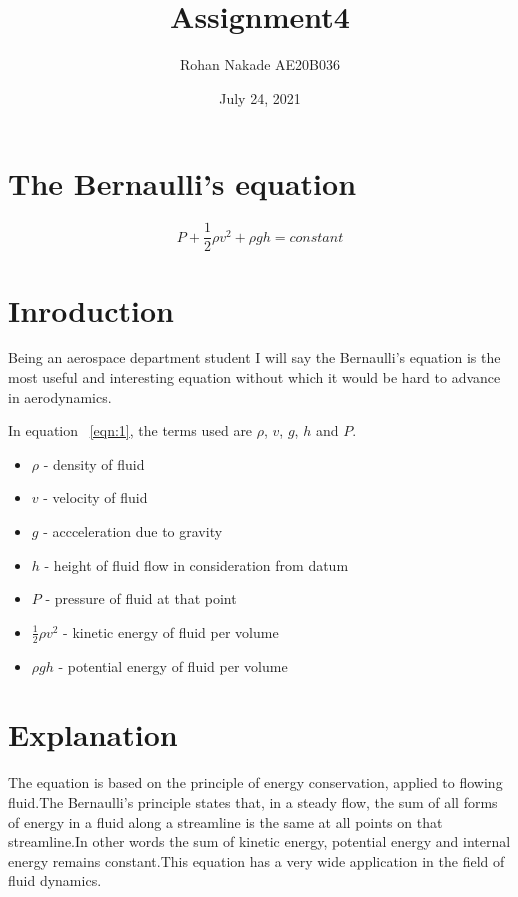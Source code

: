 \documentclass[a4paper,12pt]{article}
\begin{document}
\title{Assignment4}
\date{July 24, 2021}
\author{Rohan Nakade AE20B036}
\maketitle
\section{The Bernaulli's equation}
\begin{equation}
P + \frac{1}{2}\rho v^2 + \rho gh = constant
\label{eqn:1}
\end{equation}

\section{Inroduction}
Being an aerospace department student I will say the Bernaulli's equation is the most useful and interesting equation without which it would be hard to advance in aerodynamics. 

In equation ~\ref{eqn:1}, the terms used are $ \rho $, $ v $, $ g $, $ h $ and $ P $.
\begin{itemize}
\item $\rho$ - density of fluid
\item $v$ - velocity of fluid
\item $g$ - accceleration due to gravity
\item $h$ - height of fluid flow in consideration from datum
\item $P$ - pressure of fluid at that point
\item $\frac{1}{2}\rho v^2$ - kinetic energy of fluid per volume
\item $\rho gh$ - potential energy of fluid per volume
\end{itemize}


\section{Explanation}
The equation is based on the principle of energy conservation, applied to flowing fluid.The Bernaulli's principle states that, in a steady flow, the sum of all forms of energy in a fluid along a streamline is the same at all points on that streamline.In other words the sum of kinetic energy, potential energy and internal energy remains constant.This equation has a very wide application in the field of fluid dynamics.
\end{document}
